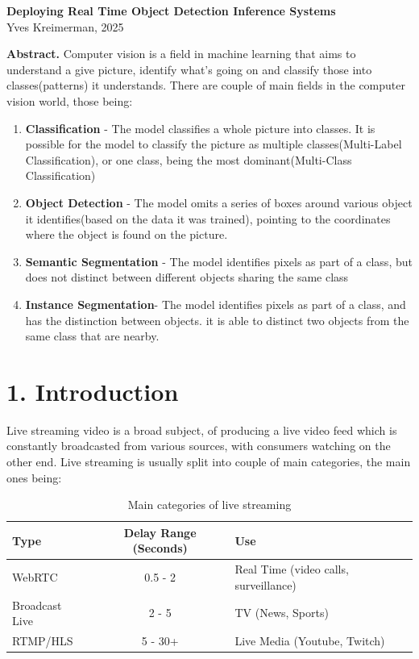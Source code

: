 \documentclass[
]{article}
\author{}
\date{}
\providecommand{\tightlist}{%
  \setlength{\itemsep}{0pt}\setlength{\parskip}{0pt}}
\begin{document}
\begin{center}
{\Large \textbf{Deploying Real Time Object Detection Inference Systems}} \\
\vspace{1em}
Yves Kreimerman, 2025
\end{center}

\textbf{Abstract.} Computer vision is a field in machine learning that
aims to understand a give picture, identify what's going on and classify
those into classes(patterns) it understands. There are couple of main
fields in the computer vision world, those being:

\begin{enumerate}
\def\labelenumi{\arabic{enumi}.}
\tightlist
\item
  \textbf{Classification} - The model classifies a whole picture into
  classes. It is possible for the model to classify the picture as
  multiple classes(Multi-Label Classification), or one class, being the
  most dominant(Multi-Class Classification) \newline
\item
  \textbf{Object Detection} - The model omits a series of boxes around
  various object it identifies(based on the data it was trained),
  pointing to the coordinates where the object is found on the picture.
  \newline
\item
  \textbf{Semantic Segmentation} - The model identifies pixels as part
  of a class, but does not distinct between different objects sharing
  the same class \newline
\item
  \textbf{Instance Segmentation}- The model identifies pixels as part of
  a class, and has the distinction between objects. it is able to
  distinct two objects from the same class that are nearby.
\end{enumerate}

\section{1. Introduction}\label{introduction}

Live streaming video is a broad subject, of producing a live video feed
which is constantly broadcasted from various sources, with consumers
watching on the other end. Live streaming is usually split into couple
of main categories, the main ones being:

\begin{table}[h!]
\centering
\begin{tabular}{|l|c|l|}
\hline
\textbf{Type} & \textbf{Delay Range (Seconds)} & \textbf{Use} \\
\hline
WebRTC & 0.5 - 2 & Real Time (video calls, surveillance) \\
\hline
Broadcast Live & 2 - 5 & TV (News, Sports) \\
\hline
RTMP/HLS & 5 - 30+ & Live Media (Youtube, Twitch) \\
\hline
\end{tabular}
\caption{Main categories of live streaming}
\end{table}
\end{document}
